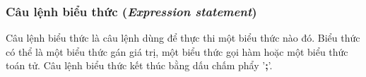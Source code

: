 \subsubsection{Câu lệnh biểu thức (\textit{Expression statement})}            
\label{ch2:expr_stmt}
\regexexprstmt

Câu lệnh biểu thức là câu lệnh dùng để thực thi một biểu thức nào đó. Biểu thức có thể là một biểu thức gán giá trị, một biểu thức gọi hàm hoặc một biểu thức toán tử. Câu lệnh biểu thức kết thúc bằng dấu chấm phẩy '\textbf{;}'.
